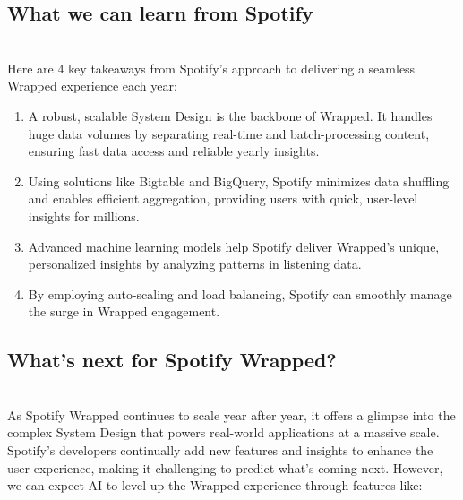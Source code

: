 \subsection{What we can learn from Spotify~}\label{iKFYKqWCMAHD4Ruf0k5Go}
\\
Here are 4 key takeaways from Spotify's approach to delivering a seamless Wrapped experience each year:

\begin{enumerate}
\item
\protect{}\label{HmTp-ZAZhG4ULoJiMy5Gn}
A robust, scalable System Design is the backbone of Wrapped. It handles huge data volumes by separating real-time and batch-processing content, ensuring fast data access and reliable yearly insights.
\item
\protect{}\label{ejyygQYdu972MV-anogIq}
Using solutions like Bigtable and BigQuery, Spotify minimizes data shuffling and enables efficient aggregation, providing users with quick, user-level insights for millions.
\item
\protect{}\label{_Bmbf5Ua4mrbqLkANJB49}
Advanced machine learning models help Spotify deliver Wrapped's unique, personalized insights by analyzing patterns in listening data.
\item
\protect{}\label{yW01UvTkJIivPc6WPWKkt}
By employing auto-scaling and load balancing, Spotify can smoothly manage the surge in Wrapped engagement.
\end{enumerate}

\subsection{What's next for Spotify Wrapped?}\label{xQmIFQTpkANu2zXd0qY1m}
\\
As Spotify Wrapped continues to scale year after year, it offers a glimpse into the complex System Design that powers real-world applications at a massive scale.~
\\
Spotify's developers continually add new features and insights to enhance the user experience, making it challenging to predict what's coming next. However, we can expect AI to level up the Wrapped experience through features like:

